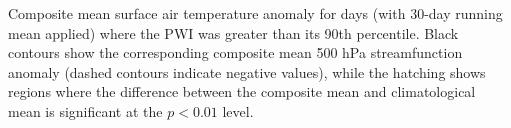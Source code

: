\label{fig:tas_composite}
Composite mean surface air temperature anomaly for days (with 30-day running mean applied) where the PWI was greater than its 90th percentile. Black contours show the corresponding composite mean 500 hPa streamfunction anomaly (dashed contours indicate negative values), while the hatching shows regions where the difference between the composite mean and climatological mean is significant at the $p < 0.01$ level.